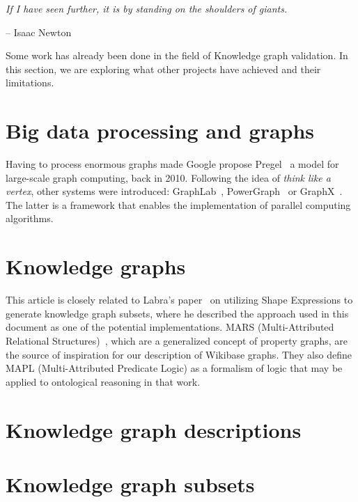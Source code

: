 \epigraph{\textit{If I have seen further, it is by standing on the shoulders of giants.}}{-- \textup{Isaac Newton}}

Some work has already been done in the field of Knowledge graph validation. In this section, we are exploring what other projects have achieved and their limitations.

\section{Big data processing and graphs}

Having to process enormous graphs made Google propose Pregel~\cite{10.1145/1807167.1807184} a model for large-scale graph computing, back in 2010. Following the idea of \textit{think like a vertex}, other systems were introduced: GraphLab~\cite{10.14778/2212351.2212354}, PowerGraph~\cite{180251} or GraphX~\cite{186216}. The latter is a framework that enables the implementation of parallel computing algorithms.

\section{Knowledge graphs}

This article is closely related to Labra's paper~\cite{https://doi.org/10.48550/arxiv.2110.11709} on utilizing Shape Expressions to generate knowledge graph subsets, where he described the approach used in this document as one of the potential implementations. MARS (Multi-Attributed Relational Structures)~\cite{ijcai2017p165}, which are a generalized concept of property graphs, are the source of inspiration for our description of Wikibase graphs. They also define MAPL (Multi-Attributed Predicate Logic) as a formalism of logic that may be applied to ontological reasoning in that work.

\section{Knowledge graph descriptions}

\section{Knowledge graph subsets}